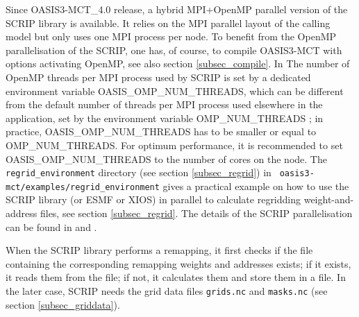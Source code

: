  Since OASIS3-MCT\_4.0 release, a hybrid MPI+OpenMP parallel version
 of the SCRIP library is available. It relies on the MPI parallel
 layout of the calling model but only uses one MPI process per
 node. To benefit from the OpenMP parallelisation of the SCRIP, one has, of course, to compile OASIS3-MCT with options activating OpenMP, see also section \ref{subsec_compile}. In The number of OpenMP threads per MPI process used by SCRIP is
 set by a dedicated environment variable OASIS\_OMP\_NUM\_THREADS,
 which can be different from the default number of threads per MPI
 process used elsewhere in the application, set by the environment
 variable OMP\_NUM\_THREADS ; in practice, OASIS\_OMP\_NUM\_THREADS has
 to be smaller or equal to OMP\_NUM\_THREADS. For optimum performance,
 it is recommended to set OASIS\_OMP\_NUM\_THREADS to the number of
 cores on the node. The {\tt regrid\_environment} directory (see
 section \ref{subsec_regrid}) in {\tt
 oasis3-mct/examples/regrid\_environment} gives a practical example on
how to use the SCRIP library (or ESMF or XIOS) in parallel to 
calculate regridding weight-and-address files, see section \ref{subsec_regrid}. The details of the
SCRIP parallelisation can be found in \cite{piacentini08} and
\cite{valcke11}.

  When the SCRIP library performs a remapping, it first checks if the
  file containing the corresponding remapping weights and addresses
  exists; if it exists, it reads them from the file; if not, it
  calculates them and store them in a file. In the later case, SCRIP
  needs the grid data files {\tt grids.nc} and {\tt masks.nc} (see
  section \ref{subsec_griddata}).

